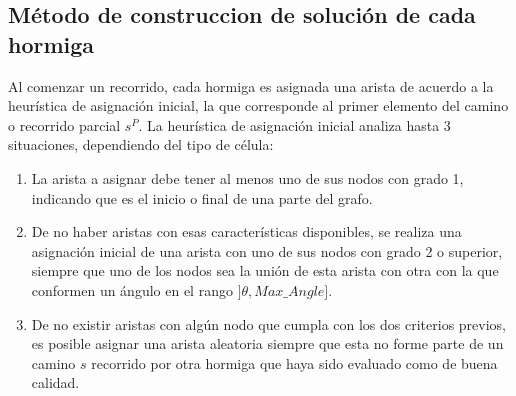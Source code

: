 \subsection{M\'etodo de construccion de soluci\'on de cada hormiga}
\label{subsubsec:antTourInit}
Al comenzar un recorrido, cada hormiga es asignada una arista de acuerdo a la heur\'istica de asignaci\'on inicial, la que corresponde al primer elemento del camino o recorrido parcial $s^{P}$. La heur\'istica de asignaci\'on inicial analiza hasta 3 situaciones, dependiendo del tipo de c\'elula:
\begin{enumerate}
\item La arista a asignar debe tener al menos uno de sus nodos con grado 1, indicando que es el inicio o final de una parte del grafo.

\item De no haber aristas con esas caracter\'isticas disponibles, se realiza una asignaci\'on inicial de una arista con uno de sus nodos con grado 2 o superior, siempre que uno de los nodos sea la uni\'on de esta arista con otra con la que conformen un \'angulo en el rango $]\theta, Max\_Angle]$. 

\item De no existir aristas con alg\'un nodo que cumpla con los dos criterios previos, es posible asignar una arista aleatoria siempre que esta no forme parte de un camino $s$ recorrido por otra hormiga que haya sido evaluado como de buena calidad.
\end{enumerate}


